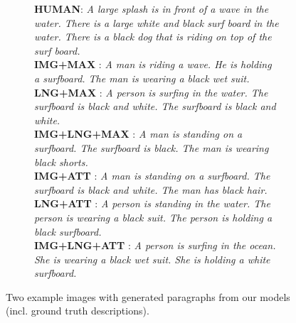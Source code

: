 \documentclass[11pt,a4paper]{article}
\begin{document}
\begin{figure}[t]
\begin{subfigure}[t]{.48\textwidth}
        \centering
        \caption{
        \baselineskip
        \textbf{HUMAN}: \textit{A large splash is in front of a wave in the water. There is a large white and black surf board in the water. There is a black dog that is riding on top of the surf board.}\\
 \textbf{IMG+MAX} : \textit{A man is riding a wave. He is holding a surfboard. The man is wearing a black wet suit.}\\
 \textbf{LNG+MAX} : \textit{A person is surfing in the water. The surfboard is black and white. The surfboard is black and white.}\\
 \textbf{IMG+LNG+MAX} : \textit{A man is standing on a surfboard. The surfboard is black. The man is wearing black shorts.} \\
 \textbf{IMG+ATT} : \textit{A man is standing on a surfboard. The surfboard is black and white. The man has black hair.}\\
 \textbf{LNG+ATT} : \textit{A person is standing in the water. The person is wearing a black suit. The person is holding a black surfboard.}\\
 \textbf{IMG+LNG+ATT} : \textit{A person is surfing in the ocean. She is wearing a black wet suit. She is holding a white surfboard.} }
        \label{fig:badexample}
    \end{subfigure}
    \caption{Two example images with generated paragraphs from our models (incl. ground truth descriptions).}
    \label{fig:examples}
\end{figure}
\end{document}
